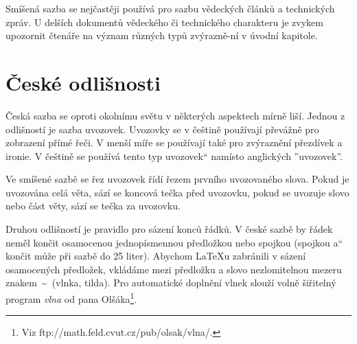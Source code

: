 \documentclass[11pt,a4paper,twocolumn]{article}
\newcommand{\myuv}[1]{\quotedblbase #1\textquotedblleft}
\begin{document}
	Smíšená sazba se nejčastěji používá pro sazbu vě\-deckých článků a technických zpráv. U delších dokumentů vědeckého či technického charakteru je zvykem upozornit čtenáře na význam různých typů zvýrazně-ní v úvodní kapitole.
	
	\section{České odlišnosti}
	
	Česká sazba se oproti okolnímu světu v některých aspektech mírně liší. Jednou z odlišností je sazba uvo\-zovek. Uvozovky se v češtině používají převážně pro zobrazení přímé řeči. V menší míře se používají také pro zvýraznění přezdívek a ironie. V češtině se použí\-vá tento \myuv{typ uvozovek} namísto anglických ''uvozovek''.
	
	Ve smíšené sazbě se řez uvozovek řídí řezem první\-ho uvozovaného slova. Pokud je uvozována celá věta, sází se koncová tečka před uvozovku, pokud se uvozuje slovo nebo část věty, sází se tečka za uvozovku.
	
	Druhou odlišností je pravidlo pro sázení konců řádků. V české sazbě by řádek neměl končit osamocenou jednopísmennou předložkou nebo spojkou (spojkou \myuv{a} končit může při sazbě do 25 liter). Abychom \LaTeX u zabránili v sázení osamocených předložek, vkládáme mezi předložku a slovo nezlomitelnou mezeru znakem\, \textasciitilde\, (vlnka, tilda). Pro automatické doplnění vlnek slouží volně šiřitelný program \textit{vlna} od pana Olšáka\footnote{ Viz ftp://math.feld.cvut.cz/pub/olsak/vlna/.}.

	
\end{document}
